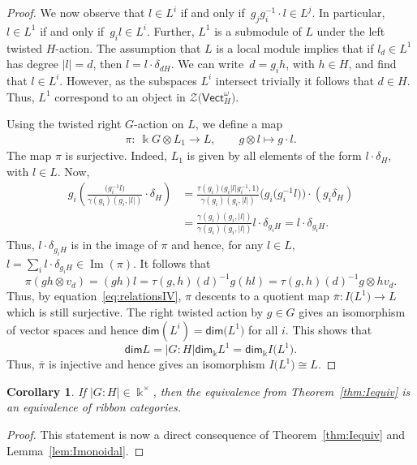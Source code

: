 \documentclass[10pt,a4paper]{amsart}
\numberwithin{equation}{section}
\newtheorem{Corollary}[Theorem]{Corollary}
\newcommand{\ov}[1]{\overline{#1}}
\newcommand{\Img}{\operatorname{Im}}
\renewcommand{\dim}{\mathsf{dim}}
\newcommand{\Vect}{\mathsf{Vect}}
\newcommand{\cZ}{\mathcal{Z}}
\begin{document}
\begin{proof}
We now observe that $l\in L^i$ if and only if~$g_jg_i^{-1}\cdot l\in L^j$. In particular, $l\in L^1$ if and only if~$g_il \in L^i$. Further, $L^1$ is a submodule of $L$ under the left twisted $H$-action. The assumption that $L$ is a local module implies that if $l_d\in L^1$ has degree $|l|=d$, then
$l=l\cdot \delta_{dH}$. We can write~$d=g_i h$, with $h\in H$, and find that $l\in L^i$. However, as the subspaces $L^i$ intersect trivially it follows that $d\in H$. Thus, $L^1$ correspond to an object in $\cZ\big(\Vect_H^\omega\big)$.

Using the twisted right $G$-action on $L$, we define a map
\begin{align*}
\pi\colon\ \Bbbk G \otimes L_1 \longrightarrow L, \qquad
g \otimes l \mapsto g\cdot l.
\end{align*}
The map $\pi$ is surjective. Indeed, $L_1$ is given by all elements of the form $l\cdot \delta_{H}$, with $l\in L$. Now,
\begin{align*}
g_i \left(\frac{\big(g_i^{-1}l\big)}{\gamma(g_i)(g_i,|l|)}\cdot \delta_{H}\right)&=\frac{\tau(g_i)\big(g_i|l|g_i^{-1},1\big)}{\gamma(g_i)(g_i,|l|)}\big(g_i\big(g_i^{-1}l\big)\big)\cdot (g_i\delta_{H})\\
&=\frac{\gamma(g_i)(g_i,|l|)}{\gamma(g_i)(g_i,|l|)}l\cdot \delta_{g_iH}=l\cdot \delta_{g_iH}.
\end{align*}
Thus, $l\cdot \delta_{g_iH}$ is in the image of $\pi$ and hence, for any $l\in L$,
$l=\sum_i l\cdot \delta_{g_iH}\in \Img(\pi).$
It follows that
\[\pi(gh \otimes v_d)=(gh)l=\tau(g,h)(d)^{-1}g(hl)= \tau(g,h)(d)^{-1}g \otimes h v_d.\]
Thus, by equation~\eqref{eq:relationsIV}, $\pi$ descents to a quotient map
$\ov{\pi}\colon I\big(L^1\big) \to L$
which is still surjective. The right twisted action by $g\in G$ gives an isomorphism of vector spaces and hence $\dim(L^i)=\dim\big(L^1\big)$ for all $i$. This shows that
\[\dim L = |G:H|\dim_\Bbbk L^1=\dim_\Bbbk I\big(L^1\big).\]
Thus, $\ov{\pi}$ is injective and hence gives an isomorphism $I\big(L^1\big)\cong L$.
\end{proof}

\begin{Corollary}
If $|G:H|\in \Bbbk^\times$, then the equivalence from Theorem~{\rm \ref{thm:Iequiv}} is an equivalence of ribbon categories.
\end{Corollary}
\begin{proof}
This statement is now a direct consequence of Theorem~\ref{thm:Iequiv} and Lemma~\ref{lem:Imonoidal}.
\end{proof}
\end{document}
